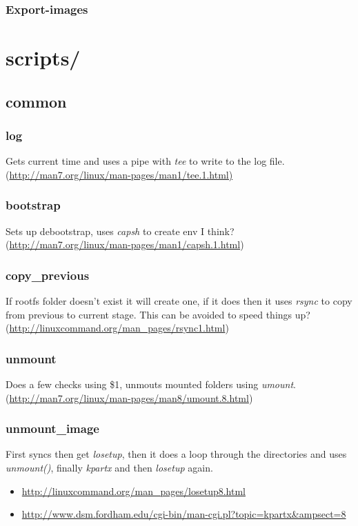\documentclass[12pt,a4paper]{report}
\begin{document}
\subsubsection{Export-images}

\section{scripts/}
\subsection{common}
\subsubsection{log}
Gets current time and uses a pipe with \textit{tee} to write to the log file. 
\\(\url{http://man7.org/linux/man-pages/man1/tee.1.html)}
\subsubsection{bootstrap}
Sets up debootstrap, uses \textit{capsh} to create env I think? 
\\(\url{http://man7.org/linux/man-pages/man1/capsh.1.html})
\subsubsection{copy\_previous}
If rootfs folder doesn't exist it will create one, if it does then it uses \textit{rsync} to copy from previous to current stage. This can be avoided to speed things up?
\\(\url{http://linuxcommand.org/man_pages/rsync1.html})
\subsubsection{unmount}
Does a few checks using \$1, unmouts mounted folders using \textit{umount}.
\\(\url{http://man7.org/linux/man-pages/man8/umount.8.html})
\subsubsection{unmount\_image}
First syncs then get \textit{losetup}, then it does a loop through the directories and uses \textit{unmount()}, finally \textit{kpartx} and then \textit{losetup} again.
\begin{itemize}
\item{\url{http://linuxcommand.org/man_pages/losetup8.html}}
\item{\url{http://www.dsm.fordham.edu/cgi-bin/man-cgi.pl?topic=kpartx&ampsect=8}}
\end{itemize}
\end{document}
